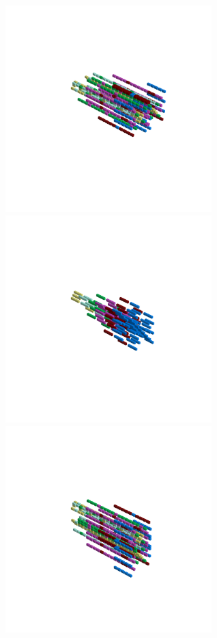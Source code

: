 \begin{minipage}[b]{0.50\linewidth}                                       
  \begin{figure}[H]
      \centering
        \vspace*{-1cm}
        \hspace*{-2cm}
        \includegraphics[width=8cm]{src/symmetries/pattern5_1-45.png}%
        \hspace*{-4cm}
        \includegraphics[width=8cm]{src/symmetries/pattern5_2-45.png}\\
        \vspace*{-5cm}
        \hspace*{-1cm}
        \includegraphics[width=8cm]{src/symmetries/pattern5_3-45.png}\\

\end{figure}
\end{minipage}
